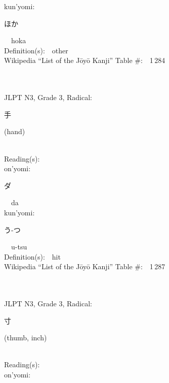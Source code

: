 \begin{multicols}{2}
{\hspace*{1em}}kun'yomi:\ \ \\
{\hspace*{2em}}{\begin{CJK}{UTF8}{min} ほか \end{CJK}}\ \ hoka\ \ \\
Definition(s):\ \ other \\
Wikipedia ``List of the J\=oy\=o Kanji'' Table \#:\ \ 1\,284 \\
\ \ \\
{\fontsize{34pt}{40pt}  }\ \ \\  %
{JLPT N3, Grade 3, Radical:\ \ {\begin{CJK}{UTF8}{min} 手 \end{CJK}} (hand) } \\
Reading(s):\ \ \\
{\hspace*{1em}}on'yomi:\ \ \\
{\hspace*{2em}}{\begin{CJK}{UTF8}{min} ダ \end{CJK}}\ \ da\ \ \\
{\hspace*{1em}}kun'yomi:\ \ \\
{\hspace*{2em}}{\begin{CJK}{UTF8}{min} う-つ \end{CJK}}\ \ u-tsu\ \ \\
Definition(s):\ \ hit \\
Wikipedia ``List of the J\=oy\=o Kanji'' Table \#:\ \ 1\,287 \\
\ \ \\
{\fontsize{34pt}{40pt}  }\ \ \\  %
{JLPT N3, Grade 3, Radical:\ \ {\begin{CJK}{UTF8}{min} 寸 \end{CJK}} (thumb, inch) } \\
Reading(s):\ \ \\
{\hspace*{1em}}on'yomi:\ \ \\

\end{multicols}
